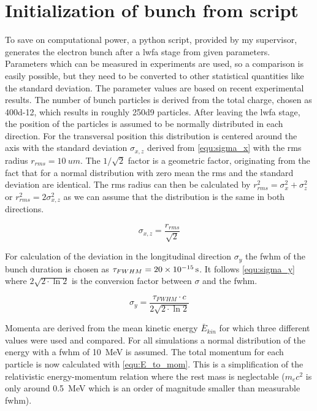 \documentclass[bachelor_thesis]{subfiles}
\begin{document}
\section{Initialization of bunch from script}\label{chap:init}
To save on computational power, a python script, provided by my supervisor, generates the electron bunch after a \gls{lwfa} stage from given parameters. Parameters which can be measured in experiments are used,
so a comparison is easily possible, but they need to be converted to other statistical quantities like the standard deviation. The parameter values are based on recent experimental results\cite{Kurz2021, Schoebel2022, Cabadag2021}.
The number of bunch particles is derived from the total charge, chosen as \qty{400d-12}{\C}, which results in roughly \num{250d9} particles. After leaving the \gls{lwfa} stage, the position of the particles is assumed to be normally distributed in each direction.
For the transversal position this distribution is centered around the axis with the standard deviation $\sigma_{x,z}$ derived from \autoref{equ:sigma_x} with the \gls{rms} radius $r_{rms}=\qty{10}{um}$.
The $1/\sqrt{2}$ factor is a geometric factor, originating from the fact that for a normal distribution with zero mean the \gls{rms} and the standard deviation are identical. 
The \gls{rms} radius can then be calculated by $r_{rms}^2=\sigma_{x}^2 + \sigma_{z}^2$ or $r_{rms}^2=2\sigma_{x,z}^2$ as we can assume that the distribution is the same in both directions.

\begin{equation}
	\sigma_{x,z}=\frac{r_{rms}}{\sqrt{2}} 
	\label{equ:sigma_x}
\end{equation}

For calculation of the deviation in the longitudinal direction $\sigma_y$ the \gls{fwhm} of the bunch duration is chosen as $\tau_{FWHM}=\qty{20d-15}{\s}$. 
It follows \autoref{equ:sigma_y} where $2\sqrt{2\cdot\ln{2}}$ is the conversion factor between $\sigma$ and the \gls{fwhm}.

\begin{equation}
	\sigma_{y}=\frac{\tau_{FWHM}\cdot c}{2\sqrt{2\cdot\ln{2}}}
	\label{equ:sigma_y}
\end{equation}

Momenta are derived from the mean kinetic energy $\bar{E}_{kin}$ for which three different  values were used and compared. 
For all simulations a normal distribution of the energy with a \gls{fwhm} of \qty{10}{\MeV} is assumed. The total momentum for each particle is now calculated with \autoref{equ:E_to_mom}.
This is a simplification of the relativistic energy-momentum relation where the rest mass is neglectable ($m_{e}c^2$ is only around \qty{0.5}{\MeV} which is an order of magnitude smaller than measurable \gls{fwhm}).
\end{document}
